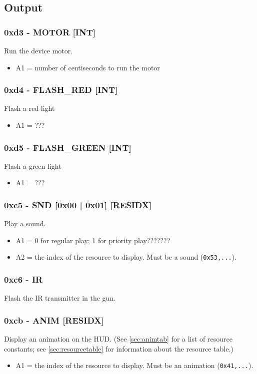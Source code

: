 \documentclass[12pt,a4paper]{scrbook}
\begin{document}
\subsection{Output}

\subsubsection{0xd3 - MOTOR [INT]}
Run the device motor.
\begin{itemize}
\item A1 = number of centiseconds to run the motor
\end{itemize}

\subsubsection{0xd4 - FLASH\_RED [INT]}
Flash a red light
\begin{itemize}
\item A1 = ??? 
\end{itemize}

\subsubsection{0xd5 - FLASH\_GREEN [INT]}
Flash a green light
\begin{itemize}
\item A1 = ???
\end{itemize}

\subsubsection{0xc5 - SND [0x00 | 0x01] [RESIDX] }
Play a sound.
\begin{itemize}
\item A1 = 0 for regular play; 1 for priority play???????
\item A2 = the index of the resource to display.  Must be a sound (\texttt{0x53,...}). 
\end{itemize}

\subsubsection{0xc6 - IR}
Flash the IR transmitter in the gun.

\subsubsection{0xcb - ANIM [RESIDX]}
Display an animation on the HUD.  (See \ref{sec:animtab} for a list of resource constants;
see \ref{sec:resourcetable} for information about the resource table.)
\begin{itemize}
\item A1 = the index of the resource to display.  Must be an animation (\texttt{0x41,...}).
\end{itemize}
\end{document}
